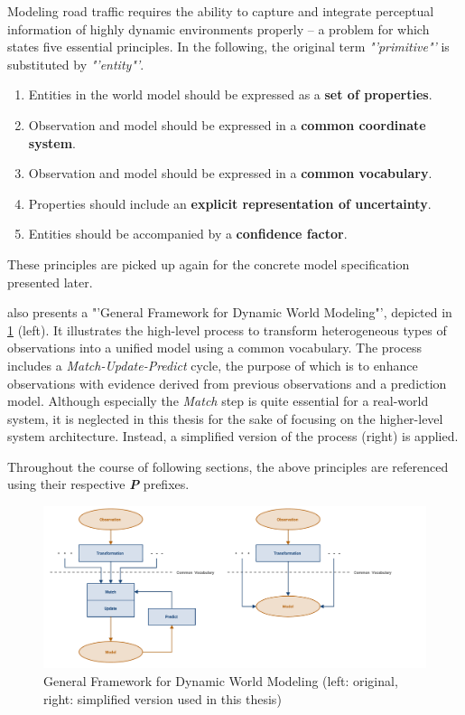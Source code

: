\begin{samepage}
	Modeling road traffic requires the ability to capture and integrate perceptual information of highly dynamic environments properly – a problem for which \cite{Crowley1993} states five essential principles. In the following, the original term \textit{"'primitive"'} is substituted by \textit{"'entity"'}. 
	
	\begin{enumerate}[\ \ P1:]
		\item Entities in the world model should be expressed as a \textbf{set of properties}.
		\item Observation and model should be expressed in a \textbf{common coordinate system}.
		\item Observation and model should be expressed in a \textbf{common vocabulary}.
		\item Properties should include an \textbf{explicit representation of uncertainty}.
		\item Entities should be accompanied by a \textbf{confidence factor}.
	\end{enumerate}
\end{samepage}

These principles are picked up again for the concrete model specification presented later.

\cite{Crowley1993} also presents a "'General Framework for Dynamic World Modeling"', depicted in \cref{fig:dynamic_world_modeling} (left). It illustrates the high-level process to transform heterogeneous types of observations into a unified model using a common vocabulary. The process includes a \textit{Match-Update-Predict} cycle, the purpose of which is to enhance observations with evidence derived from previous observations and a prediction model. Although especially the \textit{Match} step is quite essential for a real-world system, it is neglected in this thesis for the sake of focusing on the higher-level system architecture. Instead, a simplified version of the process (right) is applied.

Throughout the course of following sections, the above principles are referenced using their respective \textit{\textbf{P}} prefixes.

\begin{figure}
	\centering
	\includegraphics[width=1.0\linewidth]{98_images/dynamic_world_modeling}
	\caption[General Framework for Dynamic World Modeling]{General Framework for Dynamic World Modeling \cite{Crowley1993} (left: original, right: simplified version used in this thesis)}
	\label{fig:dynamic_world_modeling}
\end{figure}

